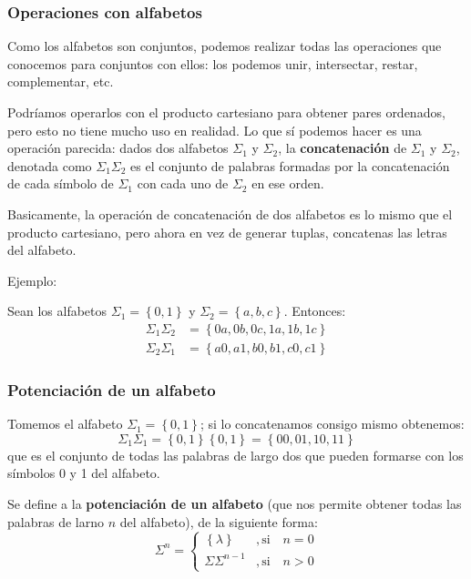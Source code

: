 \documentclass[12pt]{article}
\begin{document}
\subsubsection{Operaciones con alfabetos}
Como los alfabetos son conjuntos, podemos realizar todas las operaciones que conocemos para conjuntos con ellos: los podemos unir, intersectar, restar, complementar, etc.

Podríamos operarlos con el producto cartesiano para obtener pares ordenados, pero esto no tiene mucho uso en realidad. Lo que sí podemos hacer es una operación parecida: dados dos alfabetos $ \Sigma_{1} $ y $ \Sigma_{2} $, la \textbf{concatenación} de $ \Sigma_{1} $ y $ \Sigma_{2} $, denotada como $ \Sigma_{1}\Sigma_{2} $ es el conjunto de palabras formadas por la concatenación de cada símbolo de $ \Sigma_{1} $ con cada uno de $ \Sigma_{2} $ en ese orden.

Basicamente, la operación de concatenación de dos alfabetos es lo mismo que el producto cartesiano, pero ahora en vez de generar tuplas, concatenas las letras del alfabeto.

Ejemplo:

Sean los alfabetos $ \Sigma_{1} = \left\{0,1\right\} $ y $ \Sigma_{2} = \left\{a,b,c\right\} $. Entonces:
\begin{align*}
	\Sigma_{1}\Sigma_{2} & = \left\{0a,0b,0c,1a,1b,1c\right\} \\
	\Sigma_{2}\Sigma_{1} & = \left\{a0,a1,b0,b1,c0,c1\right\}
\end{align*}

\subsubsection{Potenciación de un alfabeto}
Tomemos el alfabeto $ \Sigma_{1} = \left\{0,1\right\} $; si lo concatenamos consigo mismo obtenemos:
\[
	\Sigma_{1}\Sigma_{1} = \left\{0,1\right\}\left\{0,1\right\} = \left\{00,01,10,11\right\}
\]
que es el conjunto de todas las palabras de largo dos que pueden formarse con los símbolos 0 y 1 del alfabeto.

Se define a la \textbf{potenciación de un alfabeto} (que nos permite obtener todas las palabras de larno $ n $ del alfabeto), de la siguiente forma:
\[
	\Sigma^{n} = \begin{cases}
		\left\{\lambda\right\} & , \text{si}\quad n = 0 \\
		\Sigma\Sigma^{n-1}     & , \text{si}\quad n > 0
	\end{cases}
\]
\end{document}
